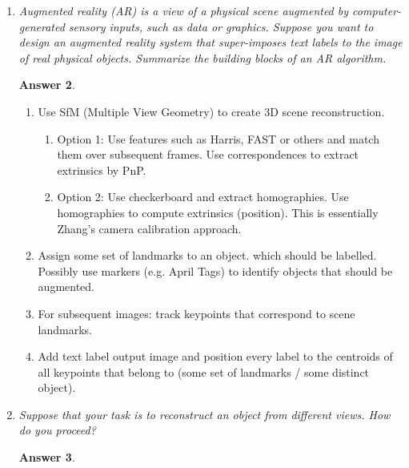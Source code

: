 \documentclass[a4paper,12 pt]{article}
\theoremstyle{definition}
\theoremstyle{remark}
\theoremstyle{definition}
\theoremstyle{definition}
\theoremstyle{definition}
\theoremstyle{definition}
\theoremstyle{remark}
\theoremstyle{remark}
\theoremstyle{definition}
\theoremstyle{definition}
\newtheorem*{answer}{Answer}
\begin{document}
\begin{enumerate}
\begin{answer}
\begin{enumerate}
\begin{enumerate}
\item Loop detection: use place recognition by BoW or other algorithms to update landmarks and transformations to align with loop closure.
\item Local Graph optimization: Refine graph by minimizing the reprojection error of landmarks over all frames in which they were observed. The argument over which is minimized are the camera poses.
\end{enumerate}
\end{enumerate}
\end{answer}
\item \textit{Augmented reality (AR) is a view of a physical scene augmented by computer-generated sensory inputs, such as data or graphics. Suppose you want to design an augmented reality system that super-imposes text labels to the image of real physical objects. Summarize the building blocks of an AR algorithm.}
\begin{answer}
\
\begin{enumerate}
\item Use SfM (Multiple View Geometry) to create 3D scene reconstruction.
\begin{enumerate}
\item Option 1: Use features such as Harris, FAST or others and match them over subsequent frames. Use correspondences to extract extrinsics by PnP.
\item Option 2: Use checkerboard and extract homographies. Use homographies to compute extrinsics (position). This is essentially Zhang's camera calibration approach.
\end{enumerate}
\item Assign some set of landmarks to an object. which should be labelled. Possibly use markers (e.g. April Tags) to identify objects that should be augmented.
\item For subsequent images: track keypoints that correspond to scene landmarks.
\item Add text label output image and position every label to the centroids of all keypoints that belong to (some set of landmarks / some distinct object).
\end{enumerate}
\end{answer}
\item \textit{Suppose that your task is to reconstruct an object from different views. How do you proceed?}
\begin{answer}
\
\begin{enumerate}

\end{enumerate}
\end{answer}
\end{enumerate}
\end{document}
